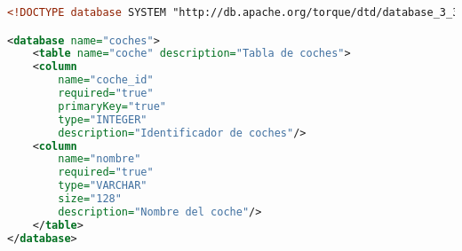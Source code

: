 \begin{lstlisting}[language=xml]
<!DOCTYPE database SYSTEM "http://db.apache.org/torque/dtd/database_3_3.dtd">

<database name="coches">
	<table name="coche" description="Tabla de coches">
	<column
		name="coche_id"
		required="true"
		primaryKey="true"
		type="INTEGER"
		description="Identificador de coches"/>
	<column
		name="nombre"
		required="true"
		type="VARCHAR"
		size="128"
		description="Nombre del coche"/>
	</table>
</database>
\end{lstlisting}